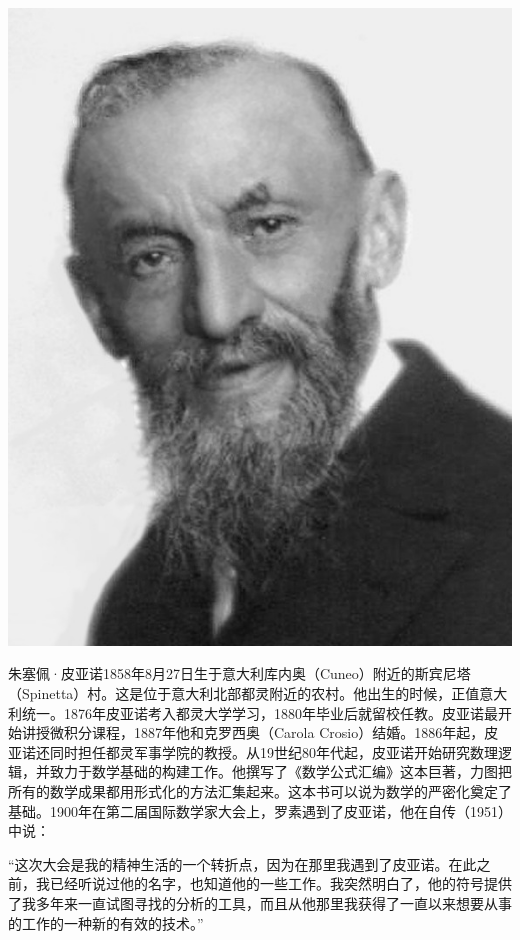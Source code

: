 \documentclass[b5paper]{ctexart}
\begin{document}
\begin{mdframed}

\begin{center}
 \includegraphics[scale=0.2]{img/Peano}
 \label{fig:Peano}
\end{center}

朱塞佩·皮亚诺1858年8月27日生于意大利库内奥（Cuneo）附近的斯宾尼塔（Spinetta）村。这是位于意大利北部都灵附近的农村。他出生的时候，正值意大利统一。1876年皮亚诺考入都灵大学学习，1880年毕业后就留校任教。皮亚诺最开始讲授微积分课程，1887年他和克罗西奥（Carola Crosio）结婚。1886年起，皮亚诺还同时担任都灵军事学院的教授。从19世纪80年代起，皮亚诺开始研究数理逻辑，并致力于数学基础的构建工作。他撰写了《数学公式汇编》这本巨著，力图把所有的数学成果都用形式化的方法汇集起来。这本书可以说为数学的严密化奠定了基础。1900年在第二届国际数学家大会上，罗素遇到了皮亚诺，他在自传（1951）中说\cite{M-Kline-2007}：

“这次大会是我的精神生活的一个转折点，因为在那里我遇到了皮亚诺。在此之前，我已经听说过他的名字，也知道他的一些工作。我突然明白了，他的符号提供了我多年来一直试图寻找的分析的工具，而且从他那里我获得了一直以来想要从事的工作的一种新的有效的技术。”


\end{mdframed}
\end{document}
